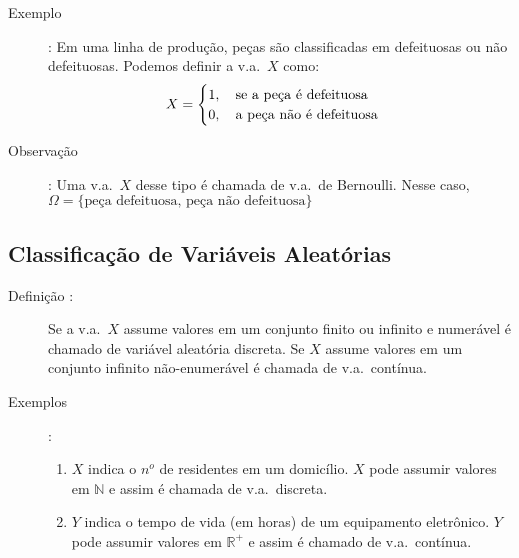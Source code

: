 \begin{description}
     \item [Exemplo]: Em uma linha de produção, peças são classificadas em defeituosas ou não
       defeituosas. Podemos definir a v.a.\ $X$ como:
       \begin{align*}
         X=
         \begin{cases}
           1,\text{\quad  se a peça é defeituosa}\\ 
           0,\text{\quad  a peça não é defeituosa}
         \end{cases}
       \end{align*}
     \item [Observação]: Uma v.a.\ $X$ desse tipo é chamada de v.a.\ de Bernoulli. Nesse caso, $\Omega=\{ \text{peça defeituosa, peça não defeituosa} \}$
   \end{description}
   \subsection{Classificação de Variáveis Aleatórias}
   \begin{description}
     \item [Definição :] Se a v.a.\ $X$ assume valores em um conjunto finito ou infinito e numerável é chamado 
       de variável aleatória discreta. Se $X$ assume valores em um conjunto infinito não-enumerável
       é chamada de v.a.\ contínua.

     \item [Exemplos]:

       \begin{enumerate}[label=(\alph*)]
         \item $X$ indica o $n^o$ de residentes em um domicílio. $X$ pode assumir valores em $\mathbb{N}$ e assim é chamada de 
           v.a.\ discreta.

         \item $Y$ indica o tempo de vida (em horas) de um equipamento eletrônico. $Y$ pode 
           assumir valores em $\mathbb{R}^+$ e assim é chamado de v.a.\ contínua.
       \end{enumerate}
   \end{description}
